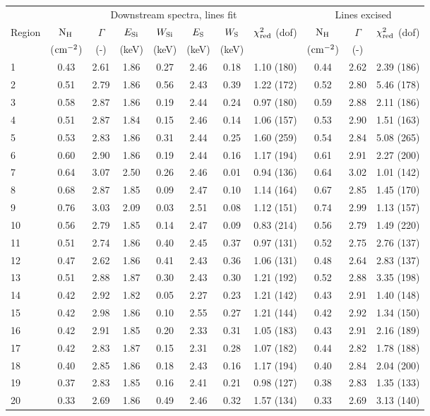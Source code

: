 \begin{tabular}{@{}lcccccclccr@{}}
\toprule
{} & \multicolumn{7}{c}{Downstream spectra, lines fit}
& \multicolumn{3}{c}{Lines excised} \\
\cmidrule(lr){2-8} \cmidrule(l){9-11}
Region & $\mathrm{N_H}$ & $\Gamma$ & $E_{\mathrm{Si}}$ & $W_{\mathrm{Si}}$
& $E_{\mathrm{S}}$ & $W_{\mathrm{S}}$ & $\chi^2_{\mathrm{red}}$ (dof)
& $\mathrm{N_H}$ & $\Gamma$ & $\chi^2_{\mathrm{red}}$ (dof) \\
{} & ($\mathrm{cm}^{-2}$) & (-) & (keV) & (keV) & (keV) & (keV) & {}
& ($\mathrm{cm}^{-2}$) & (-) & {} \\
\midrule
1 & 0.43 & 2.61 & 1.86 & 0.27 & 2.46 & 0.18 & 1.10 (180) & 0.44 & 2.62 & 2.39 (186) \\
2 & 0.51 & 2.79 & 1.86 & 0.56 & 2.43 & 0.39 & 1.22 (172) & 0.52 & 2.80 & 5.46 (178) \\
3 & 0.58 & 2.87 & 1.86 & 0.19 & 2.44 & 0.24 & 0.97 (180) & 0.59 & 2.88 & 2.11 (186) \\
\cmidrule{1-11}
4 & 0.51 & 2.87 & 1.84 & 0.15 & 2.46 & 0.14 & 1.06 (157) & 0.53 & 2.90 & 1.51 (163) \\
5 & 0.53 & 2.83 & 1.86 & 0.31 & 2.44 & 0.25 & 1.60 (259) & 0.54 & 2.84 & 5.08 (265) \\
6 & 0.60 & 2.90 & 1.86 & 0.19 & 2.44 & 0.16 & 1.17 (194) & 0.61 & 2.91 & 2.27 (200) \\
7 & 0.64 & 3.07 & 2.50 & 0.26 & 2.46 & 0.01 & 0.94 (136) & 0.64 & 3.02 & 1.01 (142) \\
8 & 0.68 & 2.87 & 1.85 & 0.09 & 2.47 & 0.10 & 1.14 (164) & 0.67 & 2.85 & 1.45 (170) \\
9 & 0.76 & 3.03 & 2.09 & 0.03 & 2.51 & 0.08 & 1.12 (151) & 0.74 & 2.99 & 1.13 (157) \\
10 & 0.56 & 2.79 & 1.85 & 0.14 & 2.47 & 0.09 & 0.83 (214) & 0.56 & 2.79 & 1.49 (220) \\
\cmidrule{1-11}
11 & 0.51 & 2.74 & 1.86 & 0.40 & 2.45 & 0.37 & 0.97 (131) & 0.52 & 2.75 & 2.76 (137) \\
12 & 0.47 & 2.62 & 1.86 & 0.41 & 2.43 & 0.36 & 1.06 (131) & 0.48 & 2.64 & 2.83 (137) \\
13 & 0.51 & 2.88 & 1.87 & 0.30 & 2.43 & 0.30 & 1.21 (192) & 0.52 & 2.88 & 3.35 (198) \\
\cmidrule{1-11}
14 & 0.42 & 2.92 & 1.82 & 0.05 & 2.27 & 0.23 & 1.21 (142) & 0.43 & 2.91 & 1.40 (148) \\
15 & 0.42 & 2.98 & 1.86 & 0.10 & 2.55 & 0.27 & 1.21 (144) & 0.42 & 2.92 & 1.34 (150) \\
16 & 0.42 & 2.91 & 1.85 & 0.20 & 2.33 & 0.31 & 1.05 (183) & 0.43 & 2.91 & 2.16 (189) \\
17 & 0.42 & 2.83 & 1.87 & 0.15 & 2.31 & 0.28 & 1.07 (182) & 0.44 & 2.82 & 1.78 (188) \\
\cmidrule{1-11}
18 & 0.40 & 2.85 & 1.86 & 0.18 & 2.43 & 0.16 & 1.17 (194) & 0.40 & 2.84 & 2.04 (200) \\
19 & 0.37 & 2.83 & 1.85 & 0.16 & 2.41 & 0.21 & 0.98 (127) & 0.38 & 2.83 & 1.35 (133) \\
20 & 0.33 & 2.69 & 1.86 & 0.49 & 2.46 & 0.32 & 1.57 (134) & 0.33 & 2.69 & 3.13 (140) \\
\bottomrule
\end{tabular}
